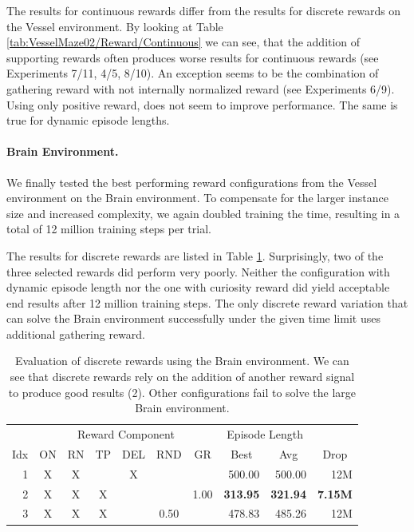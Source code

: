 The results for continuous rewards differ from the results for discrete rewards on the Vessel environment. By looking at Table \ref{tab:VesselMaze02/Reward/Continuous} we can see, that the addition of supporting rewards often produces worse results for continuous rewards (see Experiments 7/11, 4/5, 8/10). An exception seems to be the combination of gathering reward with not internally normalized reward (see Experiments 6/9). Using only positive reward, does not seem to improve performance. The same is true for dynamic episode lengths.  


\paragraph{Brain Environment.} We finally tested the best performing reward configurations from the Vessel environment on the Brain environment. To compensate for the larger instance size and increased complexity, we again doubled training the time, resulting in a total of 12 million training steps per trial. 

The results for discrete rewards are listed in Table \ref{tab:Maze0122/Reward/Discrete}. Surprisingly, two of the three selected rewards did perform very poorly. Neither the configuration with dynamic episode length nor the one with curiosity reward did yield acceptable end results after 12 million training steps. The only discrete reward variation that can solve the Brain environment successfully under the given time limit uses additional gathering reward. 


\begin{table}[htp]
    \begin{center}
        \begin{tabular}{rccccccrrr}
            \toprule
             & \multicolumn{6}{c}{Reward Component} & \multicolumn{2}{c}{Episode Length} & \\
            \cmidrule(lr){2-7}\cmidrule(lr){8-9}
            \multicolumn{1}{c}{Idx} & \multicolumn{1}{c}{ON} & \multicolumn{1}{c}{RN} & \multicolumn{1}{c}{TP} & \multicolumn{1}{c}{DEL} & \multicolumn{1}{c}{RND} & \multicolumn{1}{c}{GR} & \multicolumn{1}{c}{Best} & \multicolumn{1}{c}{Avg} & \multicolumn{1}{c}{Drop}\\
            \midrule
            1 & X & X &  & X &  &  & 500.00 & 500.00 & 12M \\
            2 & X & X & X &  &  & 1.00 & \textbf{313.95} & \textbf{321.94} & \textbf{7.15M} \\
            3 & X & X & X &  & 0.50 &  & 478.83 & 485.26 & 12M \\
            \bottomrule
        \end{tabular}
    \end{center}
    \caption[Evaluation of Discrete Rewards using the Brain Environment]{Evaluation of discrete rewards using the Brain environment. We can see that discrete rewards rely on the addition of another reward signal to produce good results (2). Other configurations fail to solve the large Brain environment.} \label{tab:Maze0122/Reward/Discrete}
\end{table}

